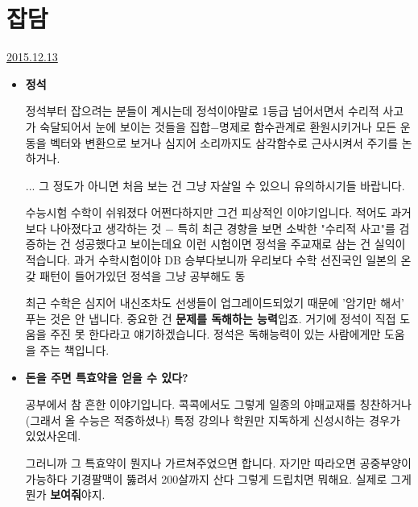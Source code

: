 \section{잡담}
\href{https://www.kockoc.com/Apoc/543390}{2015.12.13}

\vspace{5mm}


\begin{itemize}
    \item \textbf{정석}
    \vspace{5mm}

    정석부터 잡으려는 분들이 계시는데
    정석이야말로 1등급 넘어서면서 수리적 사고가 숙달되어서
    눈에 보이는 것들을 집합$-$명제로 함수관계로 환원시키거나
    모든 운동을 벡터와 변환으로 보거나
    심지어 소리까지도 삼각함수로 근사시켜서 주기를 논하거나.
    \vspace{5mm}

    ... 그 정도가 아니면 처음 보는 건 그냥 자살일 수 있으니 유의하시기들 바랍니다.
    \vspace{5mm}

    수능시험 수학이 쉬워졌다 어쩐다하지만 그건 피상적인 이야기입니다.
    적어도 과거보다 나아졌다고 생각하는 것 $-$ 특히 최근 경향을 보면 소박한 "수리적 사고"를 검증하는 건 성공했다고 보이는데요
    이런 시험이면 정석을 주교재로 삼는 건 실익이 적습니다.
    과거 수학시험이야 DB 승부다보니까 우리보다 수학 선진국인 일본의 온갖 패턴이 들어가있던 정석을 그냥 공부해도 동
    \vspace{5mm}

    최근 수학은 심지어 내신조차도 선생들이 업그레이드되었기 때문에 '암기만 해서' 푸는 것은 안 냅니다.
    중요한 건 \textbf{문제를 독해하는 능력}입죠.
    거기에 정석이 직접 도움을 주진 못 한다라고 얘기하겠습니다. 정석은 독해능력이 있는 사람에게만 도움을 주는 책입니다.
    \vspace{5mm}

    \item \textbf{돈을 주면 특효약을 얻을 수 있다?}
    \vspace{5mm}

    공부에서 참 흔한 이야기입니다.
    콕콕에서도 그렇게 일종의 야매교재를 칭찬하거나(그래서 올 수능은 적중하셨나)
    특정 강의나 학원만 지독하게 신성시하는 경우가 있었사온데.
    \vspace{5mm}

    그러니까 그 특효약이 뭔지나 가르쳐주었으면 합니다.
    자기만 따라오면 공중부양이 가능하다 기경팔맥이 뚫려서 200살까지 산다 그렇게 드립치면 뭐해요.
    실제로 그게 뭔가 \textbf{보여줘}야지.
    \vspace{5mm}


\end{itemize}
